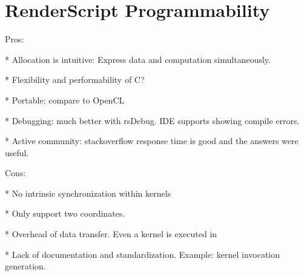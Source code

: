 \section{RenderScript Programmability}
Pros:

* Allocation is intuitive: Express data and computation simultaneously.

* Flexibility and performability of C?

* Portable; compare to OpenCL

* Debugging: much better with rsDebug. IDE supports showing compile errors.

* Active community: stackoverflow response time is good and the answers were useful.

Cons:

* No intrinsic synchronization within kernels

* Only support two coordinates.

* Overhead of data transfer. Even a kernel is executed in 

* Lack of documentation and standardization. Example: kernel invocation generation.


